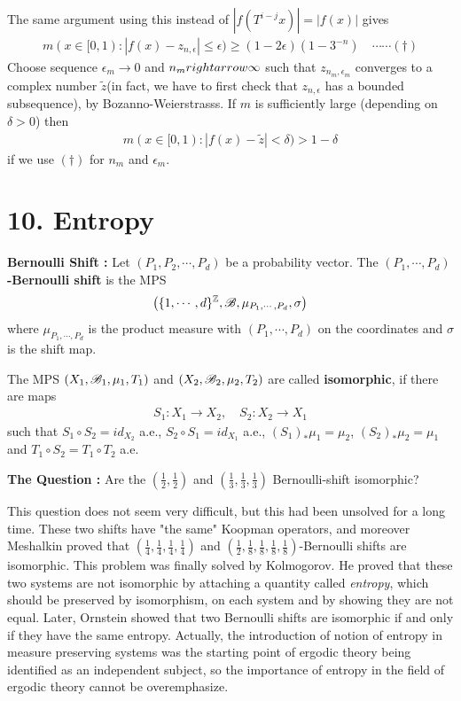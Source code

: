 \documentclass[10pt,a4paper]{report}
\begin{document}
\quad The same argument using this instead of $|f(T^{i-j}x)| = |f(x)|$ gives
\begin{align*}
m(x\in [0,1) : |f(x) - z_{n,\epsilon} | \leq \epsilon ) \geq (1-2\epsilon) (1-3^{-n}) \quad \cdots\cdots (\dagger)
\end{align*}
Choose sequence $\epsilon_m\rightarrow 0$ and $n_m\\rightarrow \infty$ such that $z_{n_m, \epsilon_m}$ converges to a complex number $\tilde{z}$(in fact, we have to first check that $z_{n,\epsilon}$ has a bounded subsequence), by Bozanno-Weierstrasss. If $m$ is sufficiently large (depending on $\delta >0$) then
\begin{align*}
m(x\in [0,1) : |f(x)-\tilde{z}| < \delta ) > 1-\delta
\end{align*}
if we use $(\dagger)$ for $n_m$ and $\epsilon_m$.

\section*{10. Entropy}

\textbf{Bernoulli Shift : } Let $(P_1, P_2,\cdots, P_d)$ be a probability vector. The \textbf{$(P_1, \cdots, P_d)$-Bernoulli shift} is the MPS
\begin{align*}
\big( \{1,\cdots, d\}^{\mathbb{Z}}, \mathscr{B}, \mu_{P_1,\cdots, P_d},\sigma \big)
\end{align*}
where $\mu_{P_1,\cdots, P_d}$ is the product measure with $(P_1,\cdots, P_d)$ on the coordinates and $\sigma$ is the shift map.
\s

 The MPS $(X_1, \mathscr{B}_1, \mu_1, T_1)$ and $(X_2,\mathscr{B}_2, \mu_2, T_2)$ are called \textbf{isomorphic}, if there are maps
\begin{align*}
S_1 : X_1\rightarrow X_2,\quad S_2 : X_2 \rightarrow X_1
\end{align*}
such that $S_1 \circ S_2 = id_{X_2}$ a.e., $S_2 \circ S_1 = id_{X_1}$ a.e., $(S_1)_* \mu_1 =\mu_2$, $(S_2)_* \mu_2 =\mu_1$ and $T_1 \circ S_2 = T_1 \circ T_2$ a.e.
\s

\textbf{The Question :} Are the $(\frac{1}{2}, \frac{1}{2})$ and $(\frac{1}{3},\frac{1}{3},\frac{1}{3})$ Bernoulli-shift isomorphic?
\s

This question does not seem very difficult, but this had been unsolved for a long time. These two shifts have "the same" Koopman operators, and moreover Meshalkin proved that $(\frac{1}{4},\frac{1}{4},\frac{1}{4},\frac{1}{4})$ and $(\frac{1}{2},\frac{1}{8},\frac{1}{8},\frac{1}{8},\frac{1}{8})$-Bernoulli shifts are isomorphic. This problem was finally solved by Kolmogorov. He proved that these two systems are not isomorphic by attaching a quantity called \emph{entropy}, which should be preserved by isomorphism, on each system and by showing they are not equal. Later, Ornstein showed that two Bernoulli shifts are isomorphic if and only if they have the same entropy. Actually, the introduction of notion of entropy in measure preserving systems was the starting point of ergodic theory being identified as an independent subject, so the importance of entropy in the field of ergodic theory cannot be overemphasize.
\s
\end{document}

